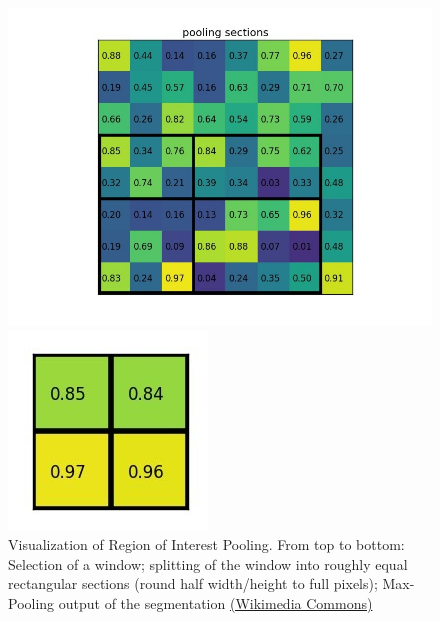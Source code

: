 \begin{frame}
\begin{figure}
{\begin{center}
        \includegraphics[scale=0.3]{roipooling2}

        \includegraphics[scale=0.3]{roipooling3}
        \caption{
          Visualization of Region of Interest Pooling.
          From top to bottom: Selection of a window; splitting of the
          window into roughly equal rectangular sections (round half
          width/height to full pixels); Max-Pooling output of the
          segmentation
          \href{https://commons.wikimedia.org/wiki/File:RoI_pooling_animated.gif}{(Wikimedia
            Commons)}
        }\label{roipooling}
      \end{center}
    }
  \end{figure}   
\end{frame}

